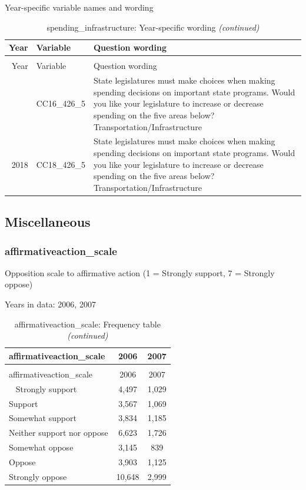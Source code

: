 \documentclass[12pt]{article}
\begin{document}
Year-specific variable names and wording

\begin{longtable}[t]{rl>{\raggedright\arraybackslash}p{10cm}}
\caption{\label{tab:unnamed-chunk-4}spending\_infrastructure: Year-specific wording}\\
\toprule
Year & Variable & Question wording\\
\midrule
\endfirsthead
\caption[]{spending\_infrastructure: Year-specific wording \textit{(continued)}}\\
\toprule
Year & Variable & Question wording\\
\midrule
\endhead
\
\endfoot
\bottomrule
\endlastfoot
2016 & CC16\_426\_5 & State legislatures must make choices when making spending decisions on important state programs. Would you like your legislature to increase or decrease spending on the five areas below? Transportation/Infrastructure\\
2018 & CC18\_426\_5 & State legislatures must make choices when making spending decisions on important state programs. Would you like your legislature to increase or decrease spending on the five areas below? Transportation/Infrastructure\\*
\end{longtable}\newpage

\subsection{Miscellaneous}\label{miscellaneous}

\subsubsection{affirmativeaction\_scale}\label{affirmativeaction_scale}

Opposition scale to affirmative action (1 = Strongly support, 7 =
Strongly oppose)

Years in data: 2006, 2007

\begin{longtable}[t]{lcc}
\caption{\label{tab:unnamed-chunk-4}affirmativeaction\_scale: Frequency table}\\
\toprule
affirmativeaction\_scale & 2006 & 2007\\
\midrule
\endfirsthead
\caption[]{affirmativeaction\_scale: Frequency table \textit{(continued)}}\\
\toprule
affirmativeaction\_scale & 2006 & 2007\\
\midrule
\endhead
\
\endfoot
\bottomrule
\endlastfoot
Strongly support & 4,497 & 1,029\\
Support & 3,567 & 1,069\\
Somewhat support & 3,834 & 1,185\\
Neither support nor oppose & 6,623 & 1,726\\
Somewhat oppose & 3,145 & 839\\
Oppose & 3,903 & 1,125\\
Strongly oppose & 10,648 & 2,999\\*
\end{longtable}
\end{document}
